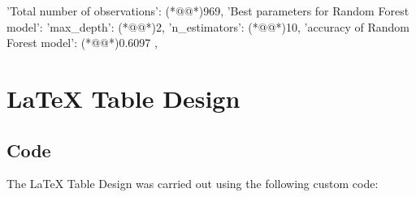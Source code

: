 \documentclass[11pt]{article}
\begin{document}
\begin{codeoutput}
{
    'Total number of observations': (*@@*)969,
    'Best parameters for Random Forest model': {'max_depth': (*@@*)2, 'n_estimators': (*@@*)10},
    'accuracy of Random Forest model': (*@@*)0.6097            ,
}
\end{codeoutput}

\section{LaTeX Table Design}
\subsection{{Code}}
The LaTeX Table Design was carried out using the following custom code:
\end{document}
